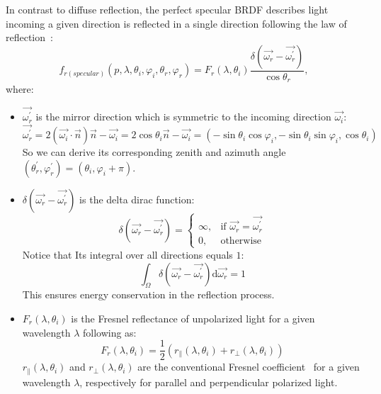 In contrast to diffuse reflection, the perfect specular BRDF describes light incoming a given direction is reflected in a single direction following the law of reflection~\cite{2012_Montes}:
\begin{equation}
    \label{eq_specular}
    f_{r(specular)}(p, \lambda, \theta_i, \varphi_i, \theta_r, \varphi_r) = F_r(\lambda, \theta_i) \frac{\delta(\overrightarrow{\omega_r} - \overrightarrow{\omega_r^\prime})}{\cos\theta_r},
\end{equation}
where:
\begin{itemize}
    \item $\overrightarrow{\omega_r^\prime}$ is the mirror direction which is symmetric to the incoming direction $\overrightarrow{\omega_i}$:
          \[
              \overrightarrow{\omega_r^\prime} = 2(\overrightarrow{\omega_i} \cdot \overrightarrow{n})\overrightarrow{n} -\overrightarrow{\omega_i} = 2 \cos \theta_i \overrightarrow{n} - \overrightarrow{\omega_i} =(-\sin\theta_i \cos \varphi_i, -\sin\theta_i \sin\varphi_i, \cos\theta_i)
          \]
          So we can derive its corresponding zenith and azimuth angle $(\theta_r^\prime, \varphi_r^\prime) = (\theta_i, \varphi_i +\pi)$.
    \item $\delta(\overrightarrow{\omega_r} - \overrightarrow{\omega_r^\prime})$ is the delta dirac function:
          \[
              \delta(\overrightarrow{\omega_r} - \overrightarrow{\omega_r^\prime}) = \begin{cases}
                  \infty, & \mbox{if $\overrightarrow{\omega_r} = \overrightarrow{\omega_r^\prime}$} \\
                  0,      & \mbox{otherwise}
              \end{cases}
          \]
          Notice that Its integral over all directions equals $1$:
          \[
              \int_{\Omega} \delta(\overrightarrow{\omega_r} - \overrightarrow{\omega_r^\prime}) \mathrm{d} \overrightarrow{\omega_r} =1
          \]
          This ensures energy conservation in the reflection process.
    \item $F_r(\lambda, \theta_i)$ is the Fresnel reflectance of unpolarized light for a given wavelength $\lambda$ following as:
          \begin{equation}
              \label{eq_fresnel}
              F_r(\lambda, \theta_i) = \frac{1}{2}\left(r_{\parallel}(\lambda, \theta_i) + r_{\perp}(\lambda, \theta_i)\right)
          \end{equation}
          $r_{\parallel}(\lambda, \theta_i)$ and $r_{\perp}(\lambda, \theta_i)$ are the conventional Fresnel coefficient~\cite{2005_Lazanyi} for a given wavelength $\lambda$, respectively for parallel and perpendicular polarized light.

\end{itemize}
